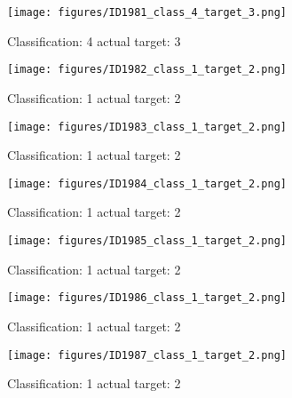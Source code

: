 \begin{figure}[h!]
\begin{center}
\texttt{[image: figures/ID1981\_class\_4\_target\_3.png]}
\end{center}
\caption{ Classification: 4 actual target: 3}
\label{fig:ID1981_class_4_target_3}
\end{figure}
\begin{figure}[h!]
\begin{center}
\texttt{[image: figures/ID1982\_class\_1\_target\_2.png]}
\end{center}
\caption{ Classification: 1 actual target: 2}
\label{fig:ID1982_class_1_target_2}
\end{figure}
\begin{figure}[h!]
\begin{center}
\texttt{[image: figures/ID1983\_class\_1\_target\_2.png]}
\end{center}
\caption{ Classification: 1 actual target: 2}
\label{fig:ID1983_class_1_target_2}
\end{figure}
\begin{figure}[h!]
\begin{center}
\texttt{[image: figures/ID1984\_class\_1\_target\_2.png]}
\end{center}
\caption{ Classification: 1 actual target: 2}
\label{fig:ID1984_class_1_target_2}
\end{figure}
\begin{figure}[h!]
\begin{center}
\texttt{[image: figures/ID1985\_class\_1\_target\_2.png]}
\end{center}
\caption{ Classification: 1 actual target: 2}
\label{fig:ID1985_class_1_target_2}
\end{figure}
\begin{figure}[h!]
\begin{center}
\texttt{[image: figures/ID1986\_class\_1\_target\_2.png]}
\end{center}
\caption{ Classification: 1 actual target: 2}
\label{fig:ID1986_class_1_target_2}
\end{figure}
\begin{figure}[h!]
\begin{center}
\texttt{[image: figures/ID1987\_class\_1\_target\_2.png]}
\end{center}
\caption{ Classification: 1 actual target: 2}
\label{fig:ID1987_class_1_target_2}
\end{figure}
